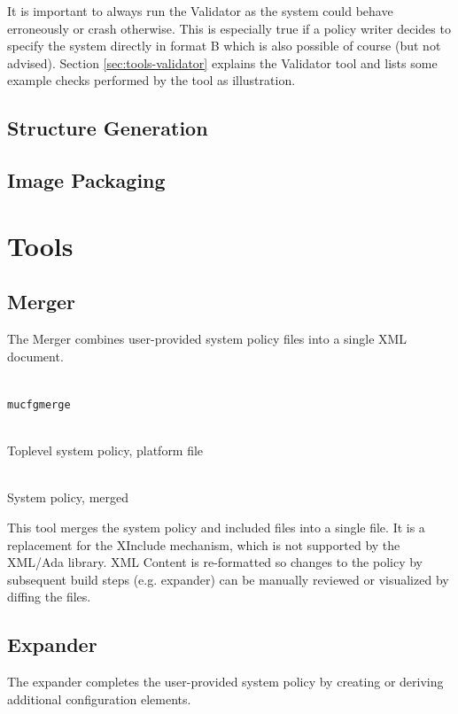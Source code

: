 \documentclass[a4paper,twoside,titlepage]{article}
\begin{document}
It is important to always run the Validator as the system could behave
erroneously or crash otherwise. This is especially true if a policy writer
decides to specify the system directly in format B which is also possible of
course (but not advised).  Section \ref{sec:tools-validator} explains the
Validator tool and lists some example checks performed by the tool as
illustration.

\subsection{Structure Generation}
\subsection{Image Packaging}

\section{Tools}
\label{sec:tools}

\subsection{Merger}
\label{sec:tools-merger}
The Merger combines user-provided system policy files into a single XML
document.

\begin{description} \itemsep1pt \parskip0pt
	\item[Name] \hfill \\
		\texttt{mucfgmerge}
	\item[Input] \hfill \\
		Toplevel system policy, platform file
	\item[Output] \hfill \\
		System policy, merged
\end{description}

This tool merges the system policy and included files into a single file. It is
a replacement for the XInclude mechanism, which is not supported by the XML/Ada
library. XML Content is re-formatted so changes to the policy by subsequent
build steps (e.g. expander) can be manually reviewed or visualized by diffing
the files.

\subsection{Expander}
\label{sec:tools-expander}
The expander completes the user-provided system policy by creating or deriving
additional configuration elements.
\end{document}
